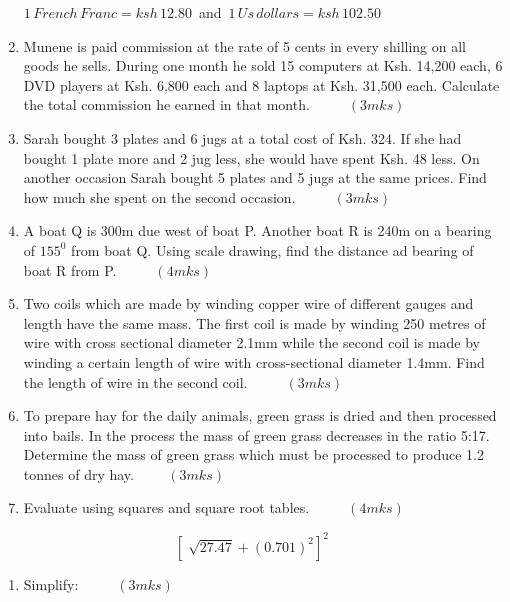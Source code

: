 \documentclass[
  a4paperpaper,
]{scrbook}
\providecommand{\tightlist}{%
  \setlength{\itemsep}{0pt}\setlength{\parskip}{0pt}}\usepackage{longtable,booktabs,array}
\begin{document}
\begin{tcolorbox}
\begin{enumerate}
  \(1\, French \, Franc = ksh \,12.80\,\) and
  \(\,1 \,Us \,dollars = ksh \,102.50\)
\item
  Munene is paid commission at the rate of 5 cents in every shilling on
  all goods he sells. During one month he sold 15 computers at Ksh.
  14,200 each, 6 DVD players at Ksh. 6,800 each and 8 laptops at Ksh.
  31,500 each. Calculate the total commission he earned in that month.
  \(\hspace{1cm} (3mks)\)
\item
  Sarah bought 3 plates and 6 jugs at a total cost of Ksh. 324. If she
  had bought 1 plate more and 2 jug less, she would have spent Ksh. 48
  less. On another occasion Sarah bought 5 plates and 5 jugs at the same
  prices. Find how much she spent on the second occasion.
  \(\hspace{1cm} (3mks)\)
\item
  A boat Q is 300m due west of boat P. Another boat R is 240m on a
  bearing of \(155^0\) from boat Q. Using scale drawing, find the
  distance ad bearing of boat R from P. \(\hspace{1cm} (4mks)\)
\item
  Two coils which are made by winding copper wire of different gauges
  and length have the same mass. The first coil is made by winding 250
  metres of wire with cross sectional diameter 2.1mm while the second
  coil is made by winding a certain length of wire with cross-sectional
  diameter 1.4mm. Find the length of wire in the second coil.
  \(\hspace{1cm} (3mks)\)
\item
  To prepare hay for the daily animals, green grass is dried and then
  processed into bails. In the process the mass of green grass decreases
  in the ratio 5:17. Determine the mass of green grass which must be
  processed to produce 1.2 tonnes of dry hay.\(\hspace{1cm} (3mks)\)
\item
  Evaluate using squares and square root tables. \(\hspace{1cm}(4mks)\)
\end{enumerate}

\[\left[\sqrt[]{27.47}+(0.701)^2 \right]^2\]

\begin{enumerate}
\def\labelenumi{\arabic{enumi}.}
\setcounter{enumi}{13}
\tightlist
\item
  Simplify: \(\hspace{1cm}(3mks)\)
\end{enumerate}


\end{tcolorbox}
\end{document}
